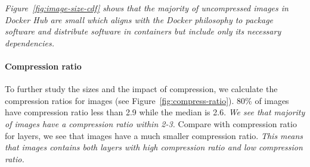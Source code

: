 \emph{Figure~\ref{fig:image-size-cdf} shows that the majority of uncompressed images in
Docker Hub are small which aligns with the Docker philosophy to package
software and distribute software in containers but include only its necessary
dependencies.}

\paragraph{Compression ratio}



To further study the sizes and the impact of compression, we calculate the
compression ratios for images (see Figure~\ref{fig:compress-ratio}).
80\% of images have compression ratio less than 2.9 while the median is 2.6. 
\textit{We see that majority of images have a compression ratio within 2-3.}
Compare with compression ratio for layers, we see that images have a much smaller
compression ratio. 
\textit{This means that images contains both layers with high compression ratio and low compression ratio.}

%
%
%
%
%
%

